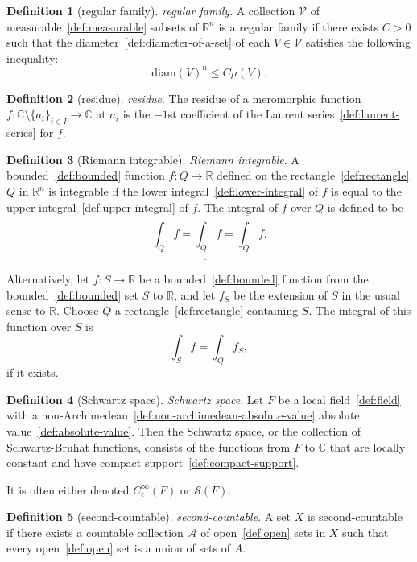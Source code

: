 \documentclass[12pt,a4paper]{article}
\theoremstyle{definition}
\newtheorem{definition}{Definition}
\begin{document}
\begin{definition}[regular family]\label{def:regular-family}
\emph{regular family}. A collection $\mathcal V$ of measurable~\ref{def:measurable} subsets of $\mathbb R^n$ is a regular family if there exists $C > 0$ such that the diameter~\ref{def:diameter-of-a-set} of each $V \in \mathcal V$ satisfies the following inequality: $$\text{diam}(V)^n \leq C\mu(V).$$
\end{definition}

\begin{definition}[residue]\label{def:residue}
\emph{residue}. The residue of a meromorphic function $f: \mathbb C\setminus \{a_i\}_{i\in I}\to \mathbb C$ at $a_i$ is the $-1$st coefficient of the Laurent series~\ref{def:laurent-series} for $f$.
\end{definition}

\begin{definition}[Riemann integrable]\label{def:riemann-integrable}
\emph{Riemann integrable}. A bounded~\ref{def:bounded} function $f:Q\to\mathbb R$ defined on the rectangle~\ref{def:rectangle} $Q$ in $\mathbb R^n$ is integrable if the lower integral~\ref{def:lower-integral} of $f$ is equal to the upper integral~\ref{def:upper-integral} of $f$. The integral of $f$ over $Q$ is defined to be $$\int_Q f = \underline{\int_Q} f = \overline{\int_Q} f.$$

Alternatively, let $f: S\to \mathbb R$ be a bounded~\ref{def:bounded} function from the bounded~\ref{def:bounded} set $S$ to $\mathbb R$, and let $f_S$ be the extension of $S$ in the usual sense to $\mathbb R$. Choose $Q$ a rectangle~\ref{def:rectangle} containing $S$. The integral of this function over $S$ is $$\int_S f = \int_Q f_S,$$ if it exists.
\end{definition}

\begin{definition}[Schwartz space]\label{def:schwartz-space}
\emph{Schwartz space}. Let $F$ be a local field~\ref{def:field} with a non-Archimedean~\ref{def:non-archimedean-absolute-value} absolute value~\ref{def:absolute-value}. Then the Schwartz space, or the collection of Schwartz-Bruhat functions, consists of the functions from $F$ to $\mathbb C$ that are locally constant and have compact support~\ref{def:compact-support}.

It is often either denoted $C_c^\infty(F)$ or $\mathcal S(F)$.
\end{definition}

\begin{definition}[second-countable]\label{def:second-countable}
\emph{second-countable}. A set $X$ is second-countable if there exists a countable collection $\mathcal A$ of open~\ref{def:open} sets in $X$ such that every open~\ref{def:open} set is a union of sets of $A$.
\end{definition}
\end{document}
